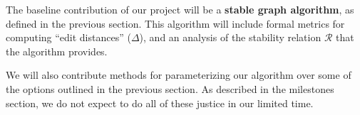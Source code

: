 The baseline contribution of our project will be a {\bf stable graph algorithm}, as defined in the previous section. This algorithm will include formal metrics for computing ``edit distances'' ($\Delta$), and an analysis of the stability relation $\mathcal{R}$ that the algorithm provides.

We will also contribute methods for parameterizing our algorithm over some of the options outlined in the previous section. As described in the milestones section, we do not expect to do all of these justice in our limited time.
